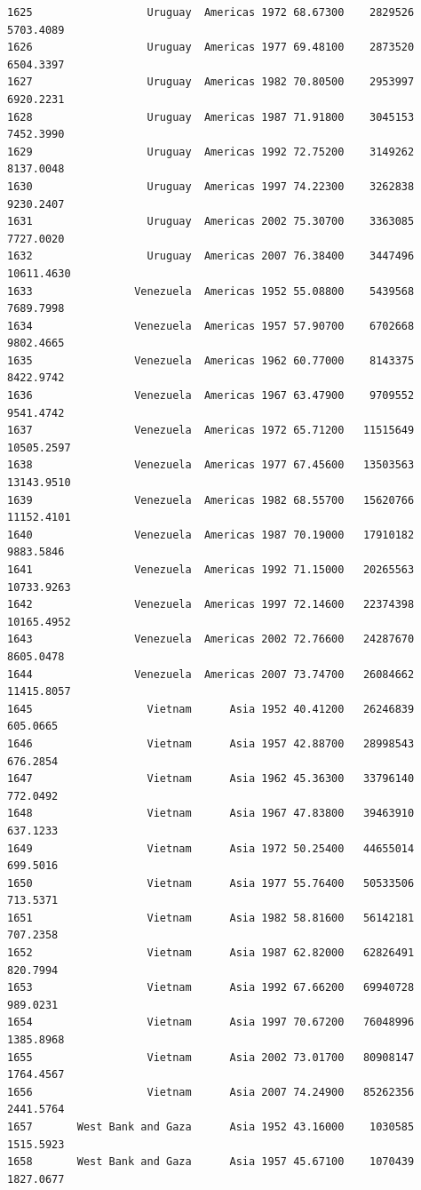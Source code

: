 \documentclass[
  letterpaper,
  DIV=11,
  numbers=noendperiod]{scrreprt}
\begin{document}
\begin{verbatim}
1625                  Uruguay  Americas 1972 68.67300    2829526   5703.4089
1626                  Uruguay  Americas 1977 69.48100    2873520   6504.3397
1627                  Uruguay  Americas 1982 70.80500    2953997   6920.2231
1628                  Uruguay  Americas 1987 71.91800    3045153   7452.3990
1629                  Uruguay  Americas 1992 72.75200    3149262   8137.0048
1630                  Uruguay  Americas 1997 74.22300    3262838   9230.2407
1631                  Uruguay  Americas 2002 75.30700    3363085   7727.0020
1632                  Uruguay  Americas 2007 76.38400    3447496  10611.4630
1633                Venezuela  Americas 1952 55.08800    5439568   7689.7998
1634                Venezuela  Americas 1957 57.90700    6702668   9802.4665
1635                Venezuela  Americas 1962 60.77000    8143375   8422.9742
1636                Venezuela  Americas 1967 63.47900    9709552   9541.4742
1637                Venezuela  Americas 1972 65.71200   11515649  10505.2597
1638                Venezuela  Americas 1977 67.45600   13503563  13143.9510
1639                Venezuela  Americas 1982 68.55700   15620766  11152.4101
1640                Venezuela  Americas 1987 70.19000   17910182   9883.5846
1641                Venezuela  Americas 1992 71.15000   20265563  10733.9263
1642                Venezuela  Americas 1997 72.14600   22374398  10165.4952
1643                Venezuela  Americas 2002 72.76600   24287670   8605.0478
1644                Venezuela  Americas 2007 73.74700   26084662  11415.8057
1645                  Vietnam      Asia 1952 40.41200   26246839    605.0665
1646                  Vietnam      Asia 1957 42.88700   28998543    676.2854
1647                  Vietnam      Asia 1962 45.36300   33796140    772.0492
1648                  Vietnam      Asia 1967 47.83800   39463910    637.1233
1649                  Vietnam      Asia 1972 50.25400   44655014    699.5016
1650                  Vietnam      Asia 1977 55.76400   50533506    713.5371
1651                  Vietnam      Asia 1982 58.81600   56142181    707.2358
1652                  Vietnam      Asia 1987 62.82000   62826491    820.7994
1653                  Vietnam      Asia 1992 67.66200   69940728    989.0231
1654                  Vietnam      Asia 1997 70.67200   76048996   1385.8968
1655                  Vietnam      Asia 2002 73.01700   80908147   1764.4567
1656                  Vietnam      Asia 2007 74.24900   85262356   2441.5764
1657       West Bank and Gaza      Asia 1952 43.16000    1030585   1515.5923
1658       West Bank and Gaza      Asia 1957 45.67100    1070439   1827.0677

\end{verbatim}
\end{document}
